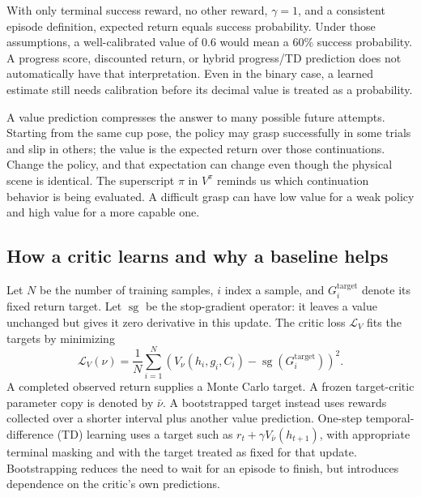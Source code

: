With only terminal success reward, no other reward, $\gamma=1$, and a consistent episode definition, expected return equals success probability. Under those assumptions, a well-calibrated value of $0.6$ would mean a 60\% success probability. A progress score, discounted return, or hybrid progress/TD prediction does not automatically have that interpretation. Even in the binary case, a learned estimate still needs calibration before its decimal value is treated as a probability.

A value prediction compresses the answer to many possible future attempts. Starting from the same cup pose, the policy may grasp successfully in some trials and slip in others; the value is the expected return over those continuations. Change the policy, and that expectation can change even though the physical scene is identical. The superscript $\pi$ in $V^\pi$ reminds us which continuation behavior is being evaluated. A difficult grasp can have low value for a weak policy and high value for a more capable one.

\subsection{How a critic learns and why a baseline helps}
Let $N$ be the number of training samples, $i$ index a sample, and $G_i^{\mathrm{target}}$ denote its fixed return target. Let $\operatorname{sg}$ be the stop-gradient operator: it leaves a value unchanged but gives it zero derivative in this update. The critic loss $\mathcal L_V$ fits the targets by minimizing
\begin{equation}
 \mathcal L_V(\nu)=\frac{1}{N}\sum_{i=1}^{N}
 \left(V_\nu(h_i,g_i,C_i)-\operatorname{sg}(G_i^{\mathrm{target}})\right)^2.
 \label{eq:critic}
\end{equation}
A completed observed return supplies a Monte Carlo target. A frozen target-critic parameter copy is denoted by $\bar\nu$. A bootstrapped target instead uses rewards collected over a shorter interval plus another value prediction. One-step temporal-difference (TD) learning uses a target such as $r_t+\gamma V_{\bar\nu}(h_{t+1})$, with appropriate terminal masking and with the target treated as fixed for that update. Bootstrapping reduces the need to wait for an episode to finish, but introduces dependence on the critic's own predictions.

